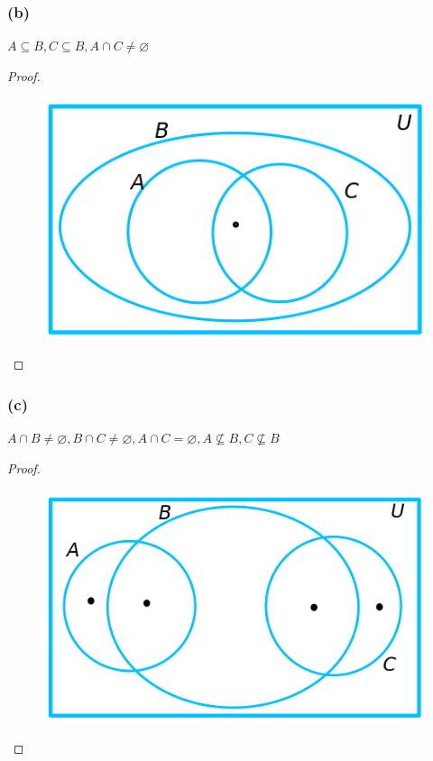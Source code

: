 \documentclass[14pt]{extarticle}
\newcommand{\es}{\varnothing}
\begin{document}
\subsubsection{(b)}
\(A \subseteq B, C \subseteq B, A \cap C \neq \es\)

\begin{proof}
\begin{figure}[ht!]
\centering
\includegraphics[scale=0.4]{../images/6.1.15.b.png}
\end{figure}
\end{proof}

\subsubsection{(c)}
\(A \cap B \neq \es, B \cap C \neq \es, A \cap C = \es, A \nsubseteq B, C \nsubseteq B\)

\begin{proof}
\begin{figure}[ht!]
\centering
\includegraphics[scale=0.4]{../images/6.1.15.c.png}
\end{figure}
\end{proof}
\end{document}
